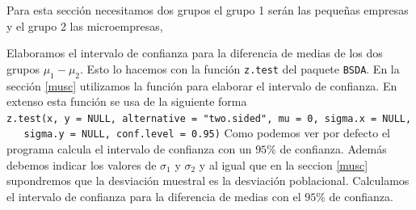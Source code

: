 \documentclass[letterpaper,]{book}
\newenvironment{Shaded}{\begin{snugshade}}{\end{snugshade}}
\newcommand{\DataTypeTok}[1]{\textcolor[rgb]{0.13,0.29,0.53}{#1}}
\newcommand{\KeywordTok}[1]{\textcolor[rgb]{0.13,0.29,0.53}{\textbf{#1}}}
\newcommand{\NormalTok}[1]{#1}
\newcommand{\OperatorTok}[1]{\textcolor[rgb]{0.81,0.36,0.00}{\textbf{#1}}}
\newcommand{\StringTok}[1]{\textcolor[rgb]{0.31,0.60,0.02}{#1}}
\begin{document}
Para esta sección necesitamos dos grupos el grupo 1 serán las pequeñas empresas y el grupo 2 las microempresas,

\begin{Shaded}
\end{Shaded}

Elaboramos el intervalo de confianza para la diferencia de medias de los dos grupos \(\mu_1-\mu_2\). Esto lo hacemos con la función \texttt{z.test} del paquete \texttt{BSDA}. En la sección \ref{musc} utilizamos la función para elaborar el intervalo de confianza. En extenso esta función se usa de la siguiente forma \texttt{z.test(x,\ y\ =\ NULL,\ alternative\ =\ "two.sided",\ mu\ =\ 0,\ sigma.x\ =\ NULL,\ \ \ sigma.y\ =\ NULL,\ conf.level\ =\ 0.95)} Como podemos ver por defecto el programa calcula el intervalo de confianza con un \(95\%\) de confianza. Además debemos indicar los valores de \(\sigma_1\) y \(\sigma_2\) y al igual que en la seccion \ref{musc} supondremos que la desviación muestral es la desviación poblacional. Calculamos el intervalo de confianza para la diferencia de medias con el \(95\)\% de confianza.

\begin{Shaded}
\end{Shaded}
\end{document}
